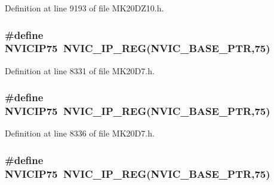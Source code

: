 Definition at line 9193 of file M\+K20\+D\+Z10.\+h.

\subsubsection[{\texorpdfstring{N\+V\+I\+C\+I\+P75}{NVICIP75}}]{\setlength{\rightskip}{0pt plus 5cm}\#define N\+V\+I\+C\+I\+P75~{\bf N\+V\+I\+C\+\_\+\+I\+P\+\_\+\+R\+EG}({\bf N\+V\+I\+C\+\_\+\+B\+A\+S\+E\+\_\+\+P\+TR},75)}\hypertarget{group___n_v_i_c___register___accessor___macros_ga501c537806814fbf14a9c970aea17c30}{}\label{group___n_v_i_c___register___accessor___macros_ga501c537806814fbf14a9c970aea17c30}


Definition at line 8331 of file M\+K20\+D7.\+h.

\subsubsection[{\texorpdfstring{N\+V\+I\+C\+I\+P75}{NVICIP75}}]{\setlength{\rightskip}{0pt plus 5cm}\#define N\+V\+I\+C\+I\+P75~{\bf N\+V\+I\+C\+\_\+\+I\+P\+\_\+\+R\+EG}({\bf N\+V\+I\+C\+\_\+\+B\+A\+S\+E\+\_\+\+P\+TR},75)}\hypertarget{group___n_v_i_c___register___accessor___macros_ga501c537806814fbf14a9c970aea17c30}{}\label{group___n_v_i_c___register___accessor___macros_ga501c537806814fbf14a9c970aea17c30}


Definition at line 8336 of file M\+K20\+D7.\+h.

\subsubsection[{\texorpdfstring{N\+V\+I\+C\+I\+P75}{NVICIP75}}]{\setlength{\rightskip}{0pt plus 5cm}\#define N\+V\+I\+C\+I\+P75~{\bf N\+V\+I\+C\+\_\+\+I\+P\+\_\+\+R\+EG}({\bf N\+V\+I\+C\+\_\+\+B\+A\+S\+E\+\_\+\+P\+TR},75)}\hypertarget{group___n_v_i_c___register___accessor___macros_ga501c537806814fbf14a9c970aea17c30}{}\label{group___n_v_i_c___register___accessor___macros_ga501c537806814fbf14a9c970aea17c30}


